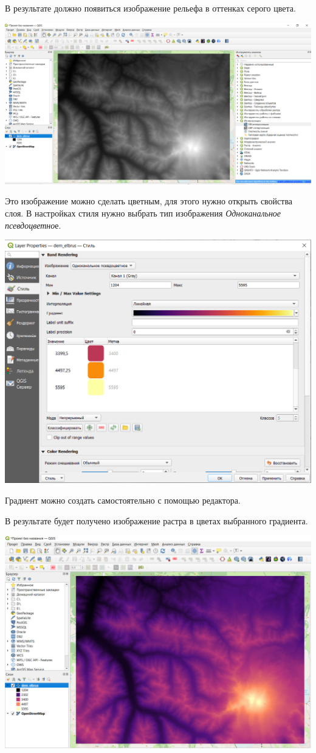 \documentclass[
]{book}
\begin{document}
В результате должно появиться изображение рельефа в оттенках серого цвета.

\includegraphics{figures/66.PNG}

Это изображение можно сделать цветным, для этого нужно открыть свойства слоя. В настройках стиля нужно выбрать тип изображения \emph{Одноканальное псевдоцветно}е.

\includegraphics{figures/67.PNG}

Градиент можно создать самостоятельно с помощью редактора.

В результате будет получено изображение растра в цветах выбранного градиента.

\includegraphics{figures/68.PNG}
\end{document}
